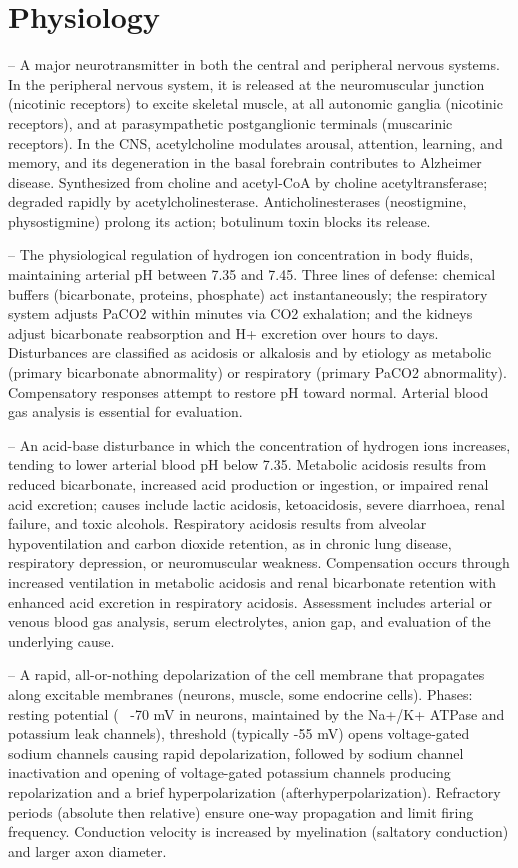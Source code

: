 \chapter{Physiology}

-- A major neurotransmitter in both the central and peripheral nervous systems. In the peripheral nervous system, it is released at the neuromuscular junction (nicotinic receptors) to excite skeletal muscle, at all autonomic ganglia (nicotinic receptors), and at parasympathetic postganglionic terminals (muscarinic receptors). In the CNS, acetylcholine modulates arousal, attention, learning, and memory, and its degeneration in the basal forebrain contributes to Alzheimer disease. Synthesized from choline and acetyl-CoA by choline acetyltransferase; degraded rapidly by acetylcholinesterase. Anticholinesterases (neostigmine, physostigmine) prolong its action; botulinum toxin blocks its release.

-- The physiological regulation of hydrogen ion concentration in body fluids, maintaining arterial pH between 7.35 and 7.45. Three lines of defense: chemical buffers (bicarbonate, proteins, phosphate) act instantaneously; the respiratory system adjusts PaCO2 within minutes via CO2 exhalation; and the kidneys adjust bicarbonate reabsorption and H+ excretion over hours to days. Disturbances are classified as acidosis or alkalosis and by etiology as metabolic (primary bicarbonate abnormality) or respiratory (primary PaCO2 abnormality). Compensatory responses attempt to restore pH toward normal. Arterial blood gas analysis is essential for evaluation.

-- An acid-base disturbance in which the concentration of hydrogen ions increases, tending to lower arterial blood pH below 7.35. Metabolic acidosis results from reduced bicarbonate, increased acid production or ingestion, or impaired renal acid excretion; causes include lactic acidosis, ketoacidosis, severe diarrhoea, renal failure, and toxic alcohols. Respiratory acidosis results from alveolar hypoventilation and carbon dioxide retention, as in chronic lung disease, respiratory depression, or neuromuscular weakness. Compensation occurs through increased ventilation in metabolic acidosis and renal bicarbonate retention with enhanced acid excretion in respiratory acidosis. Assessment includes arterial or venous blood gas analysis, serum electrolytes, anion gap, and evaluation of the underlying cause.

-- A rapid, all-or-nothing depolarization of the cell membrane that propagates along excitable membranes (neurons, muscle, some endocrine cells). Phases: resting potential (~ -70 mV in neurons, maintained by the Na+/K+ ATPase and potassium leak channels), threshold (typically -55 mV) opens voltage-gated sodium channels causing rapid depolarization, followed by sodium channel inactivation and opening of voltage-gated potassium channels producing repolarization and a brief hyperpolarization (afterhyperpolarization). Refractory periods (absolute then relative) ensure one-way propagation and limit firing frequency. Conduction velocity is increased by myelination (saltatory conduction) and larger axon diameter.

